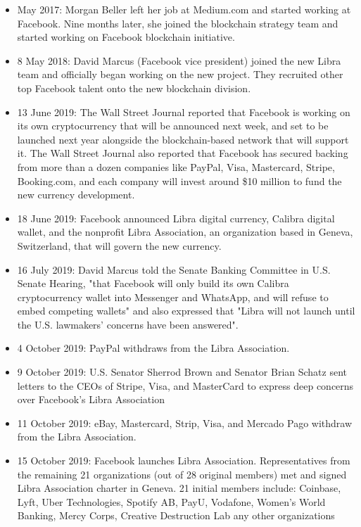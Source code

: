 \begin{itemize}
\item May 2017: Morgan Beller left her job at Medium.com and started working at Facebook. Nine months later, she joined the blockchain strategy team and started working on Facebook blockchain initiative.
\item 8 May 2018: David Marcus (Facebook vice president) joined the new Libra team and officially began working on the new project. They recruited other top Facebook talent onto the new blockchain division.
\item 13 June 2019: The Wall Street Journal reported that Facebook is working on its own cryptocurrency that will be announced next week, and set to be launched next year alongside the blockchain-based network that will support it. The Wall Street Journal also reported that Facebook has secured backing from more than a dozen companies like PayPal, Visa, Mastercard, Stripe, Booking.com, and each company will invest around \$10 million to fund the new currency development.
\item 18 June 2019: Facebook announced Libra digital currency, Calibra digital wallet, and the nonprofit Libra Association, an organization based in Geneva, Switzerland, that will govern the new currency.
\item 16 July 2019: David Marcus told the Senate Banking Committee in U.S. Senate Hearing, "that Facebook will only build its own Calibra cryptocurrency wallet into Messenger and WhatsApp, and will refuse to embed competing wallets" and also expressed that "Libra will not launch until the U.S. lawmakers' concerns have been answered".
\item 4 October 2019: PayPal withdraws from the Libra Association.
\item 9 October 2019: U.S. Senator Sherrod Brown and Senator Brian Schatz sent letters to the CEOs of Stripe, Visa, and MasterCard to express deep concerns over Facebook's Libra Association
\item 11 October 2019: eBay, Mastercard, Strip, Visa, and Mercado Pago withdraw from the Libra Association.
\item 15 October 2019: Facebook launches Libra Association. Representatives from the remaining 21 organizations (out of 28 original members) met and signed Libra Association charter in Geneva. 21 initial members include: Coinbase, Lyft, Uber Technologies, Spotify AB, PayU, Vodafone, Women's World Banking, Mercy Corps, Creative Destruction Lab any other organizations
\end{itemize}

